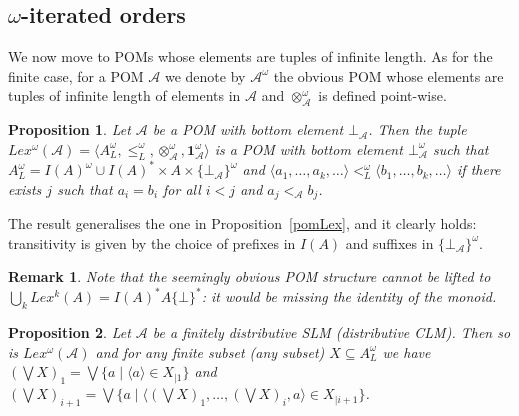 \documentclass[a4paper]{elsarticle}
\newtheorem{remark}{Remark}
\newtheorem{proposition}{Proposition}
\newcommand{\monop}{\otimes}
\newcommand{\1}{\mathbf{1}}
\begin{document}
\subsection{$\omega$-iterated orders}\label{sec:infinite}
We now move to POMs whose elements are tuples of infinite length.
As for the finite case, for a POM $\mathcal{A}$ we denote by $\mathcal{A}^\omega$
the obvious POM whose elements are tuples of infinite length
of elements in $\mathcal{A}$ and $\otimes^\omega_\mathcal{A}$ is defined point-wise.

\begin{proposition}
Let $\mathcal{A}$ be a POM with bottom element $\bot_\mathcal{A}$.
%
Then the tuple $Lex^\omega(\mathcal{A}) = \langle A_L^\omega, \leq_L^\omega, \monop^\omega_\mathcal{A}, \1^\omega_\mathcal{A} \rangle$ 
is a POM	with bottom element $\bot^\omega_\mathcal{A}$ such that 
$A_L^\omega = I(A)^\omega \cup I(A)^\ast \times A \times \{\bot_\mathcal{A}\}^\omega$
and $\langle a_1, \ldots, a_k, \ldots \rangle <^\omega_L \langle b_1, \ldots, b_k, \ldots \rangle$ if there exists $j$ such that
$a_i = b_i$ for all $i < j$ and %
$a_{j} <_\mathcal{A}  b_{j}$.
\end{proposition}

The result generalises the one in Proposition~\ref{pomLex},
and it clearly holds: transitivity is given by the choice of prefixes in $I(A)$ and suffixes 
in $\{\bot_\mathcal{A}\}^\omega$.

\begin{remark}
	Note that the seemingly obvious POM structure cannot be 
	lifted to $\bigcup_k Lex^k(A) =  I(A)^\ast A \{\bot\}^\ast$: 
	it would be missing the identity of the monoid.
\end{remark}

\begin{proposition}\label{prop:lexiSLM}
	Let $\mathcal{A}$ be a finitely distributive SLM (distributive CLM).
	Then so is $Lex^\omega(\mathcal{A})$
	and for any finite subset (any subset) $X \subseteq A^\omega_L$ 
         we have $(\bigvee X)_1 = \bigvee \{ a \mid \langle a \rangle \in X_{\mid 1}\}$
         and $(\bigvee X)_{i+1} = \bigvee \{ a \mid \langle (\bigvee X)_1, \ldots, (\bigvee X)_i, a \rangle \in X_{\mid i+1}\}$.
\end{proposition}

\end{document}
